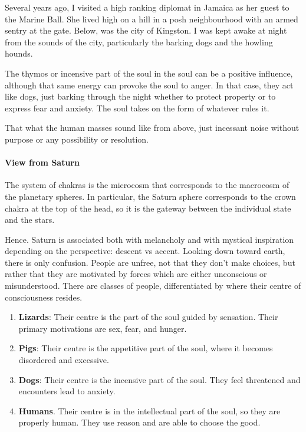 Several years ago, I visited a high ranking diplomat in Jamaica as her guest to the Marine Ball. She lived high on a hill in a posh neighbourhood with an armed sentry at the gate. Below, was the city of Kingston. I was kept awake at night from the sounds of the city, particularly the barking dogs and the howling hounds.

The thymos or incensive part of the soul in the soul can be a positive influence, although that same energy can provoke the soul to anger. In that case, they act like dogs, just barking through the night whether to protect property or to express fear and anxiety. The soul takes on the form of whatever rules it.

That what the human masses sound like from above, just incessant noise without purpose or any possibility or resolution.

\paragraph{View from Saturn}


The system of chakras is the microcosm that corresponds to the macrocosm of the planetary spheres. In particular, the Saturn sphere corresponds to the crown chakra at the top of the head, so it is the gateway between the individual state and the stars.

Hence. Saturn is associated both with melancholy and with mystical inspiration depending on the perspective: descent vs accent. Looking down toward earth, there is only confusion. People are unfree, not that they don't make choices, but rather that they are motivated by forces which are either unconscious or misunderstood. There are classes of people, differentiated by where their centre of consciousness resides.

\begin{enumerate}


\item \textbf{Lizards}: Their centre is the part of the soul guided by sensation. Their primary motivations are sex, fear, and hunger.

\item \textbf{Pigs}: Their centre is the appetitive part of the soul, where it becomes disordered and excessive.

\item \textbf{Dogs}: Their centre is the incensive part of the soul. They feel threatened and encounters lead to anxiety.

\item \textbf{Humans}. Their centre is in the intellectual part of the soul, so they are properly human. They use reason and are able to choose the good.
\end{enumerate}


